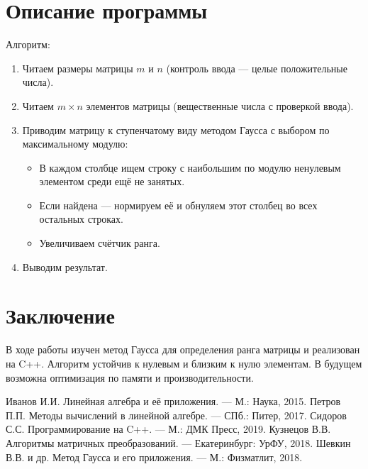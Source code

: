 \documentclass[a4paper,12pt]{article}
\begin{document}
\newpage
\section{Описание программы}
Алгоритм:
\begin{enumerate}
  \item Читаем размеры матрицы \(m\) и \(n\) (контроль ввода — целые положительные числа).
  \item Читаем \(m \times n\) элементов матрицы (вещественные числа с проверкой ввода).
  \item Приводим матрицу к ступенчатому виду методом Гаусса с выбором по максимальному модулю:
    \begin{itemize}
      \item В каждом столбце ищем строку с наибольшим по модулю ненулевым элементом среди ещё не занятых.
      \item Если найдена — нормируем её и обнуляем этот столбец во всех остальных строках.
      \item Увеличиваем счётчик ранга.
    \end{itemize}
  \item Выводим результат.
\end{enumerate}

\section*{Заключение}
В ходе работы изучен метод Гаусса для определения ранга матрицы и реализован на C++. Алгоритм устойчив к нулевым и близким к нулю элементам. В будущем возможна оптимизация по памяти и производительности.


\begin{thebibliography}{99}
 Иванов И.И. Линейная алгебра и её приложения. — М.: Наука, 2015.
 Петров П.П. Методы вычислений в линейной алгебре. — СПб.: Питер, 2017.
 Сидоров С.С. Программирование на C++. — М.: ДМК Пресс, 2019.
 Кузнецов В.В. Алгоритмы матричных преобразований. — Екатеринбург: УрФУ, 2018.
 Шевкин В.В. и др. Метод Гаусса и его приложения. — М.: Физматлит, 2018.
\end{thebibliography}
\end{document}
